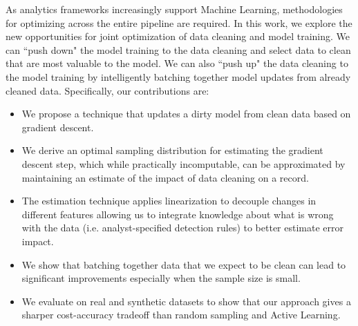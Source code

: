 As analytics frameworks increasingly support Machine Learning, methodologies for optimizing across the entire pipeline are required.
In this work, we explore the new opportunities for joint optimization of data cleaning and model training.
We can ``push down" the model training to the data cleaning and select data to clean that are most valuable to the model.
We can also ``push up" the data cleaning to the model training by intelligently batching together model updates from already cleaned data.
Specifically, our contributions are:
\begin{itemize}[noitemsep]
\item We propose a technique that updates a dirty model from clean data based on gradient descent.
\item We derive an optimal sampling distribution for estimating the gradient descent step, which while practically incomputable, can be approximated by maintaining an estimate of the impact of data cleaning on a record. 
\item The estimation technique applies linearization to decouple changes in different features allowing us to integrate knowledge about what is wrong with the data (i.e. analyst-specified detection rules) to better estimate error impact.
\item We show that batching together data that we expect to be clean can lead to significant improvements especially when the sample size is small.
\item We evaluate \sysfull on real and synthetic datasets to show that our approach gives a sharper cost-accuracy tradeoff than random sampling and Active Learning.
\end{itemize}






